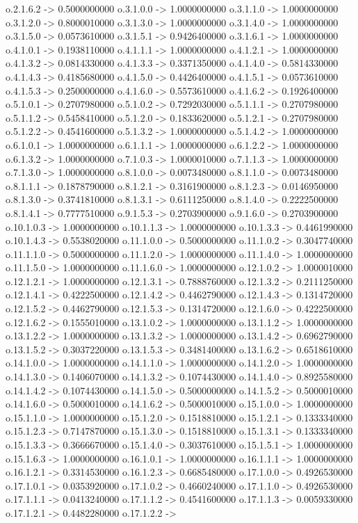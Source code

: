 o.2.1.6.2 -> 0.5000000000    o.3.1.0.0 -> 1.0000000000    o.3.1.1.0 -> 1.0000000000    o.3.1.2.0 -> 0.8000010000    o.3.1.3.0 -> 1.0000000000    o.3.1.4.0 -> 1.0000000000    o.3.1.5.0 -> 0.0573610000    o.3.1.5.1 -> 0.9426400000    o.3.1.6.1 -> 1.0000000000    o.4.1.0.1 -> 0.1938110000    o.4.1.1.1 -> 1.0000000000    o.4.1.2.1 -> 1.0000000000    o.4.1.3.2 -> 0.0814330000    o.4.1.3.3 -> 0.3371350000    o.4.1.4.0 -> 0.5814330000    o.4.1.4.3 -> 0.4185680000    o.4.1.5.0 -> 0.4426400000    o.4.1.5.1 -> 0.0573610000    o.4.1.5.3 -> 0.2500000000    o.4.1.6.0 -> 0.5573610000    o.4.1.6.2 -> 0.1926400000    o.5.1.0.1 -> 0.2707980000    o.5.1.0.2 -> 0.7292030000    o.5.1.1.1 -> 0.2707980000    o.5.1.1.2 -> 0.5458410000    o.5.1.2.0 -> 0.1833620000    o.5.1.2.1 -> 0.2707980000    o.5.1.2.2 -> 0.4541600000    o.5.1.3.2 -> 1.0000000000    o.5.1.4.2 -> 1.0000000000    o.6.1.0.1 -> 1.0000000000    o.6.1.1.1 -> 1.0000000000    o.6.1.2.2 -> 1.0000000000    o.6.1.3.2 -> 1.0000000000    o.7.1.0.3 -> 1.0000010000    o.7.1.1.3 -> 1.0000000000    o.7.1.3.0 -> 1.0000000000    o.8.1.0.0 -> 0.0073480000    o.8.1.1.0 -> 0.0073480000    o.8.1.1.1 -> 0.1878790000    o.8.1.2.1 -> 0.3161900000    o.8.1.2.3 -> 0.0146950000    o.8.1.3.0 -> 0.3741810000    o.8.1.3.1 -> 0.6111250000    o.8.1.4.0 -> 0.2222500000    o.8.1.4.1 -> 0.7777510000    o.9.1.5.3 -> 0.2703900000    o.9.1.6.0 -> 0.2703900000    o.10.1.0.3 -> 1.0000000000    o.10.1.1.3 -> 1.0000000000    o.10.1.3.3 -> 0.4461990000    o.10.1.4.3 -> 0.5538020000    o.11.1.0.0 -> 0.5000000000    o.11.1.0.2 -> 0.3047740000    o.11.1.1.0 -> 0.5000000000    o.11.1.2.0 -> 1.0000000000    o.11.1.4.0 -> 1.0000000000    o.11.1.5.0 -> 1.0000000000    o.11.1.6.0 -> 1.0000000000    o.12.1.0.2 -> 1.0000010000    o.12.1.2.1 -> 1.0000000000    o.12.1.3.1 -> 0.7888760000    o.12.1.3.2 -> 0.2111250000    o.12.1.4.1 -> 0.4222500000    o.12.1.4.2 -> 0.4462790000    o.12.1.4.3 -> 0.1314720000    o.12.1.5.2 -> 0.4462790000    o.12.1.5.3 -> 0.1314720000    o.12.1.6.0 -> 0.4222500000    o.12.1.6.2 -> 0.1555010000    o.13.1.0.2 -> 1.0000000000    o.13.1.1.2 -> 1.0000000000    o.13.1.2.2 -> 1.0000000000    o.13.1.3.2 -> 1.0000000000    o.13.1.4.2 -> 0.6962790000    o.13.1.5.2 -> 0.3037220000    o.13.1.5.3 -> 0.3481400000    o.13.1.6.2 -> 0.6518610000    o.14.1.0.0 -> 1.0000000000    o.14.1.1.0 -> 1.0000000000    o.14.1.2.0 -> 1.0000000000    o.14.1.3.0 -> 0.1406070000    o.14.1.3.2 -> 0.1074430000    o.14.1.4.0 -> 0.8925580000    o.14.1.4.2 -> 0.1074430000    o.14.1.5.0 -> 0.5000000000    o.14.1.5.2 -> 0.5000010000    o.14.1.6.0 -> 0.5000010000    o.14.1.6.2 -> 0.5000010000    o.15.1.0.0 -> 1.0000000000    o.15.1.1.0 -> 1.0000000000    o.15.1.2.0 -> 0.1518810000    o.15.1.2.1 -> 0.1333340000    o.15.1.2.3 -> 0.7147870000    o.15.1.3.0 -> 0.1518810000    o.15.1.3.1 -> 0.1333340000    o.15.1.3.3 -> 0.3666670000    o.15.1.4.0 -> 0.3037610000    o.15.1.5.1 -> 1.0000000000    o.15.1.6.3 -> 1.0000000000    o.16.1.0.1 -> 1.0000000000    o.16.1.1.1 -> 1.0000000000    o.16.1.2.1 -> 0.3314530000    o.16.1.2.3 -> 0.6685480000    o.17.1.0.0 -> 0.4926530000    o.17.1.0.1 -> 0.0353920000    o.17.1.0.2 -> 0.4660240000    o.17.1.1.0 -> 0.4926530000    o.17.1.1.1 -> 0.0413240000    o.17.1.1.2 -> 0.4541600000    o.17.1.1.3 -> 0.0059330000    o.17.1.2.1 -> 0.4482280000    o.17.1.2.2 -> 